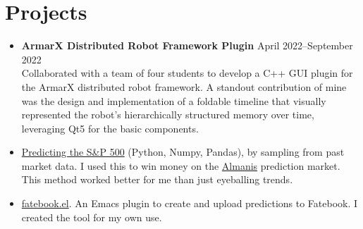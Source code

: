 \documentclass[letterpaper,9pt]{article}
\begin{document}
\section*{Projects}
\begin{itemize}
    \item \textbf{ArmarX Distributed Robot Framework Plugin} \hfill April 2022--September 2022 \\
          Collaborated with a team of four students to develop a C++ GUI plugin for the
          ArmarX distributed robot framework. A standout contribution of mine was the
          design and implementation of a foldable timeline that visually represented the
          robot's hierarchically structured memory over time, leveraging Qt5 for the basic components.
	\item \href{https://sonofhypnos.github.io/blog/prediction/python/2021/01/30/sp500.html}{Predicting the S\&P 500} (Python, Numpy, Pandas), by sampling from past market data. I used this to win money on the \href{https://www.almanisprivate.com/}{Almanis} prediction market. This method worked better for me than just eyeballing trends.
	\item \href{https://github.com/sonofhypnos/fatebook.el}{fatebook.el}. An Emacs plugin to create and upload predictions to Fatebook. I created the tool for my own use.
\end{itemize}
\end{document}
